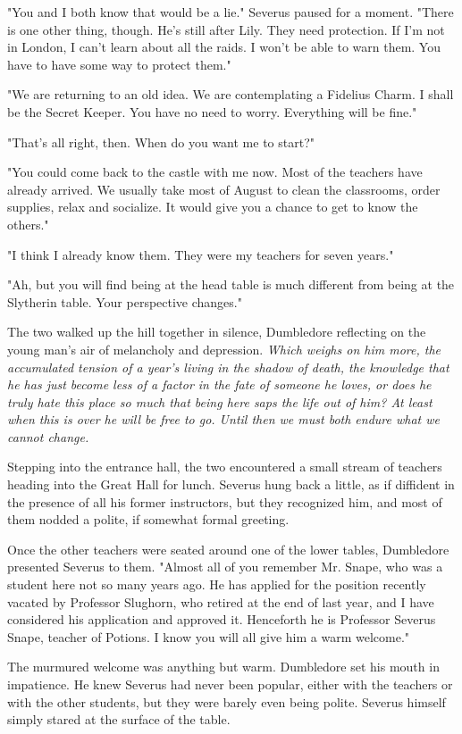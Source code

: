 "You and I both know that would be a lie." Severus paused for a moment. "There is one other thing, though. He's still after Lily. They need protection. If I'm not in London, I can't learn about all the raids. I won't be able to warn them. You have to have some way to protect them."

"We are returning to an old idea. We are contemplating a Fidelius Charm. I shall be the Secret Keeper. You have no need to worry. Everything will be fine."

"That's all right, then. When do you want me to start?"

"You could come back to the castle with me now. Most of the teachers have already arrived. We usually take most of August to clean the classrooms, order supplies, relax and socialize. It would give you a chance to get to know the others."

"I think I already know them. They were my teachers for seven years."

"Ah, but you will find being at the head table is much different from being at the Slytherin table. Your perspective changes."

The two walked up the hill together in silence, Dumbledore reflecting on the young man's air of melancholy and depression. \emph{Which weighs on him more, the accumulated tension of a year's living in the shadow of death, the knowledge that he has just become less of a factor in the fate of someone he loves, or does he truly hate this place so much that being here saps the life out of him? At least when this is over he will be free to go. Until then we must both endure what we cannot change.}

Stepping into the entrance hall, the two encountered a small stream of teachers heading into the Great Hall for lunch. Severus hung back a little, as if diffident in the presence of all his former instructors, but they recognized him, and most of them nodded a polite, if somewhat formal greeting.

Once the other teachers were seated around one of the lower tables, Dumbledore presented Severus to them. "Almost all of you remember Mr. Snape, who was a student here not so many years ago. He has applied for the position recently vacated by Professor Slughorn, who retired at the end of last year, and I have considered his application and approved it. Henceforth he is Professor Severus Snape, teacher of Potions. I know you will all give him a warm welcome."

The murmured welcome was anything but warm. Dumbledore set his mouth in impatience. He knew Severus had never been popular, either with the teachers or with the other students, but they were barely even being polite. Severus himself simply stared at the surface of the table.

